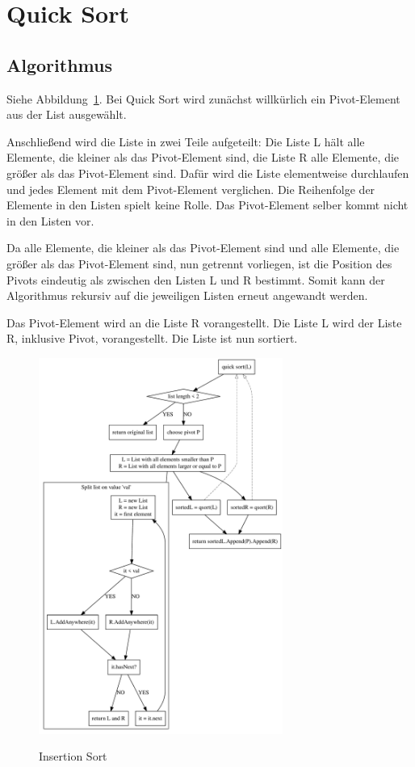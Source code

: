 \documentclass[11pt]{article}
\begin{document}
    \section{Quick Sort}\label{sec:quick-sort}

    \subsection{Algorithmus}\label{subsec:Qalgorithmus}
    Siehe Abbildung~\ref{fig:qsort}.
    Bei Quick Sort wird zunächst willkürlich ein Pivot-Element aus der List
    ausgewählt.

    Anschließend wird die Liste in zwei Teile aufgeteilt: Die Liste L hält alle
    Elemente, die kleiner als das Pivot-Element sind, die Liste R alle
    Elemente, die größer als das Pivot-Element sind.
    Dafür wird die Liste elementweise durchlaufen und jedes Element mit dem
    Pivot-Element verglichen.
    Die Reihenfolge der Elemente in den Listen spielt keine Rolle.
    Das Pivot-Element selber kommt nicht in den Listen vor.

    Da alle Elemente, die kleiner als das Pivot-Element sind und alle Elemente,
    die größer als das Pivot-Element sind, nun getrennt vorliegen, ist die
    Position des Pivots eindeutig als zwischen den Listen L und R bestimmt.
    Somit kann der Algorithmus rekursiv auf die jeweiligen Listen erneut
    angewandt werden.

    Das Pivot-Element wird an die Liste R vorangestellt.
    Die Liste L wird der Liste R, inklusive Pivot, vorangestellt.
    Die Liste ist nun sortiert.

    \begin{figure}[hbt]
        \caption{Insertion Sort}
        \centering
        \includegraphics[width = 8cm]{qsort.pdf}\label{fig:qsort}
    \end{figure}
\end{document}
